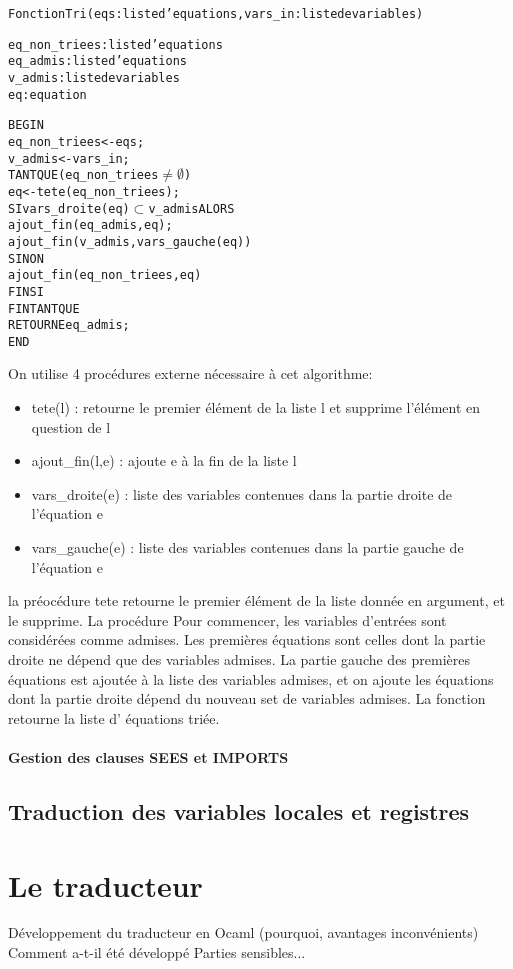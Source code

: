 \begin{alltt}
Fonction Tri (eqs: liste d'equations, vars\_in: liste de variables)

eq\_non\_triees : liste d'equations
eq\_admis : liste d'equations
v\_admis : liste de variables 
eq : equation

BEGIN
 eq\_non\_triees <- eqs;
 v\_admis <- vars\_in;
 TANT QUE (eq\_non\_triees \(\neq \emptyset \)) 
    eq <- tete(eq\_non\_triees);
    SI vars\_droite(eq) \(\subset\) v\_admis ALORS
       ajout\_fin(eq\_admis, eq);
       ajout\_fin(v\_admis, vars\_gauche(eq))
    SINON
       ajout\_fin(eq\_non\_triees, eq)
    FIN SI
 FIN TANT QUE
 RETOURNE eq\_admis;
END

\end{alltt}

On utilise 4 procédures externe nécessaire à cet algorithme:
\begin{itemize}
\item tete(l) : retourne le premier élément de la liste l et supprime l'élément
  en question de l
\item ajout\_fin(l,e) : ajoute e à la fin de la liste l
\item vars\_droite(e) : liste des variables contenues dans la partie droite de
  l'équation e
\item vars\_gauche(e) : liste des variables contenues dans la partie gauche de
  l'équation e
\end{itemize}
la préocédure tete retourne le premier élément de la liste donnée en argument,
et le supprime. La procédure 
Pour commencer, les variables d'entrées sont considérées comme admises. Les
premières équations sont celles dont la partie droite ne dépend que des
variables admises. La partie gauche des premières équations est ajoutée à la
liste des variables admises, et on ajoute les équations dont la partie droite
dépend du nouveau set de variables admises. La fonction retourne la liste d'
équations triée.


\paragraph{Gestion des clauses SEES et IMPORTS}



\subsection{Traduction des variables locales et registres}

\section{Le traducteur}
Développement du traducteur en Ocaml (pourquoi, avantages
inconvénients)
Comment a-t-il été développé
Parties sensibles...
